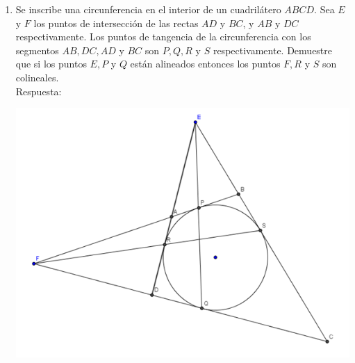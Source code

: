 \documentclass{book}
\begin{document}
\begin{enumerate}
Ahora demostremos la concurrencia. Digamos que $Q=HE\cap FQ$, $P=HE\cap DC$ y$ M=EB\cap QG$.\\
Entonces apliquemos el teorema de Menelao tomando como puntos meneláicos a $E$,$X$ y $F$:
$${HE\over EO}\cdot{OF\over FG}\cdot{GX\over XH}=1$$
Apliquemos el teorema de Menelao tomando como puntos meneláicos a $G$,$X$ y $H$:
$${FG\over GO}\cdot{OH\over HE}\cdot{EX\over FX}=1$$
Igualando las dos expresiones:
$${HE\over EO}\cdot{OF\over FG}\cdot{GX\over XH}={GO\over FG}\cdot{HE\over OH}\cdot{FX\over EX}$$
$${OF\over EO}\cdot{GX\over XH}={GO\over OH}\cdot{FX\over XE}$$
Pero por el teorema de las transversales tenemos que:
$${FX\over XE}={PH\over HE}$$
$${HP\over HE}={PD\over DF}$$
$$\Rightarrow{HP\over HE}={PD\over DF}={FX\over XE}$$
y
$${OM\over EO}={GO\over OH}$$
Sustituyendo:
$${OF\over EO}\cdot{GX\over XH}={OM\over EO}\cdot{PD\over DF}$$
Luego por ser lados opuestos de un paralelogramo tenemos que: 
$$GX=EB$$
y
$$HX=DF$$
Sustituyendo:
$${OF\over EO}\cdot{EB\over DF}={OM\over EO}\cdot{PD\over DF}$$
$${OF\over OM}={PD\over EB}$$
Ahora por el teorema de las transversales tenemos que:
$${OF\over OM}={PF\over EM}$$
$$\Rightarrow{OF\over OM}=\frac{PF-PD}{EM-EB}={DF\over BM}$$
$$\Rightarrow{DF\over BM}={PD\over EB}$$
$${EB\over BM}={PD\over DF}$$
Supongamos que $R=BQ\cap DC$, entonces por transversales se cumple que:
$${EB\over BM}={PR\over RF}$$
$$\Rightarrow{PD\over DF}={PR\over RF}$$
$${PF-DF\over DF}={PF-RF\over RF}$$
$${PF\over DF}-1={PF\over RF}-1$$
$$\Rightarrow DF=RF\Rightarrow PD=PR$$
$$\Rightarrow R=D$$
$\therefore$ Se cumple que $Q$, $B$ y $D$ son colineales y entonces tenemos que $EH$,$GF$ y $BD$ se intersecan en $Q$ $\blacksquare$\\
				\item Se inscribe una circunferencia en el interior de un cuadrilátero $ABCD$. Sea $E$ y $F$ los puntos de intersección de las rectas $AD$ y $BC$, y $AB$ y $DC$ respectivamente. Los puntos de tangencia de la circunferencia con los segmentos $AB,DC,AD$ y $BC$ son $P,Q,R$ y $S$ respectivamente. Demuestre que si los puntos $E,P$ y $Q$ están alineados entonces los puntos $F,R$ y $S$ son colineales.\\
					Respuesta:
					\begin{center}
						\includegraphics[scale=1]{imagenes/Geometria/15.png}

\end{center}
\end{enumerate}
\end{document}
